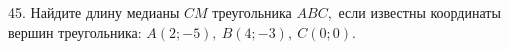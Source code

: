 45. Найдите длину медианы $CM$ треугольника $ABC,$ если известны координаты вершин треугольника: $A(2;-5),\ B(4;-3),\ C(0;0).$\\
